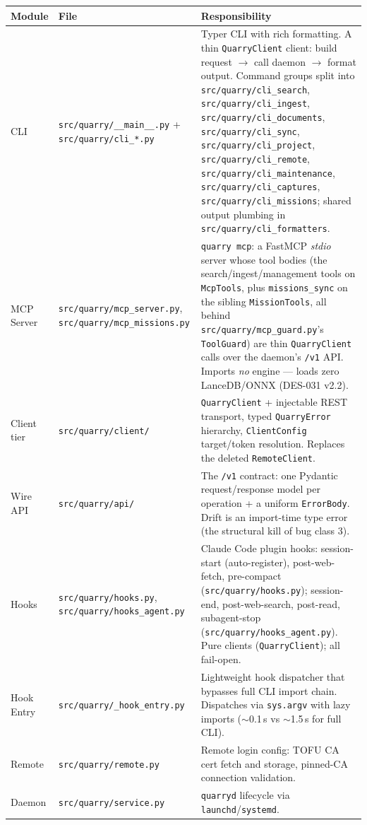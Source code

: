 \documentclass[a4paper,10pt]{article}
\newcommand{\modpath}[1]{\texttt{src/quarry/#1}}
\begin{document}
\begin{center}
\begin{tabular}{llp{7cm}}
\toprule
\textbf{Module} & \textbf{File} & \textbf{Responsibility} \\
\midrule
CLI         & \modpath{\_\_main\_\_.py} + \modpath{cli\_*.py} & Typer
              CLI with rich formatting.  A thin \texttt{QuarryClient}
              client: build request $\to$ call daemon $\to$ format
              output.  Command groups split into \modpath{cli\_search},
              \modpath{cli\_ingest}, \modpath{cli\_documents},
              \modpath{cli\_sync}, \modpath{cli\_project},
              \modpath{cli\_remote}, \modpath{cli\_maintenance},
              \modpath{cli\_captures}, \modpath{cli\_missions}; shared
              output plumbing in \modpath{cli\_formatters}. \\
MCP Server  & \modpath{mcp\_server.py}, \modpath{mcp\_missions.py} &
              \texttt{quarry mcp}: a FastMCP \emph{stdio} server whose
              tool bodies (the search/ingest/management tools on
              \texttt{McpTools}, plus \texttt{missions\_sync} on the sibling
              \texttt{MissionTools}, all behind \modpath{mcp\_guard.py}'s
              \texttt{ToolGuard}) are
              thin \texttt{QuarryClient} calls over the daemon's
              \texttt{/v1} API.  Imports \emph{no} engine --- loads zero
              LanceDB/ONNX (DES-031 v2.2). \\
Client tier & \modpath{client/}          & \texttt{QuarryClient} +
              injectable REST transport, typed \texttt{QuarryError}
              hierarchy, \texttt{ClientConfig} target/token resolution.
              Replaces the deleted \texttt{RemoteClient}. \\
Wire API    & \modpath{api/}             & The \texttt{/v1} contract:
              one Pydantic request/response model per operation +
              a uniform \texttt{ErrorBody}.  Drift is an import-time
              type error (the structural kill of bug class 3). \\
Hooks       & \modpath{hooks.py}, \modpath{hooks\_agent.py} & Claude
              Code plugin hooks: session-start (auto-register),
              post-web-fetch, pre-compact (\modpath{hooks.py});
              session-end, post-web-search, post-read, subagent-stop
              (\modpath{hooks\_agent.py}).  Pure clients
              (\texttt{QuarryClient}); all fail-open. \\
Hook Entry  & \modpath{\_hook\_entry.py} & Lightweight hook dispatcher
              that bypasses full CLI import chain.  Dispatches
              via \texttt{sys.argv} with lazy imports
              ($\sim$0.1\,s vs $\sim$1.5\,s for full CLI). \\
Remote      & \modpath{remote.py}       & Remote login config:
              TOFU CA cert fetch and storage, pinned-CA connection
              validation. \\
Daemon      & \modpath{service.py}      & \texttt{quarryd} lifecycle
              via \texttt{launchd}/\texttt{systemd}. \\
\bottomrule
\end{tabular}
\end{center}
\end{document}

